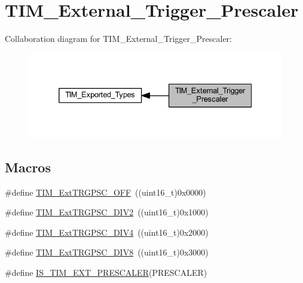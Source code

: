 \hypertarget{group___t_i_m___external___trigger___prescaler}{}\section{T\+I\+M\+\_\+\+External\+\_\+\+Trigger\+\_\+\+Prescaler}
\label{group___t_i_m___external___trigger___prescaler}
Collaboration diagram for T\+I\+M\+\_\+\+External\+\_\+\+Trigger\+\_\+\+Prescaler\+:
\nopagebreak
\begin{figure}[H]
\begin{center}
\leavevmode
\includegraphics[width=332pt]{group___t_i_m___external___trigger___prescaler}
\end{center}
\end{figure}
\subsection*{Macros}
\begin{DoxyCompactItemize}
\item 
\#define \hyperlink{group___t_i_m___external___trigger___prescaler_ga1b21757d5d1b708edca7e20481797e96}{T\+I\+M\+\_\+\+Ext\+T\+R\+G\+P\+S\+C\+\_\+\+O\+FF}~((uint16\+\_\+t)0x0000)
\item 
\#define \hyperlink{group___t_i_m___external___trigger___prescaler_ga446ed7f1bc28bcb295c43886da582e47}{T\+I\+M\+\_\+\+Ext\+T\+R\+G\+P\+S\+C\+\_\+\+D\+I\+V2}~((uint16\+\_\+t)0x1000)
\item 
\#define \hyperlink{group___t_i_m___external___trigger___prescaler_ga1de0031af7654fac2f29705f1da146c6}{T\+I\+M\+\_\+\+Ext\+T\+R\+G\+P\+S\+C\+\_\+\+D\+I\+V4}~((uint16\+\_\+t)0x2000)
\item 
\#define \hyperlink{group___t_i_m___external___trigger___prescaler_gac2fe5014d69a93ce0a22b9f3f5a7d19a}{T\+I\+M\+\_\+\+Ext\+T\+R\+G\+P\+S\+C\+\_\+\+D\+I\+V8}~((uint16\+\_\+t)0x3000)
\item 
\#define \hyperlink{group___t_i_m___external___trigger___prescaler_ga615587e6aae397d9fe8166004e7324f2}{I\+S\+\_\+\+T\+I\+M\+\_\+\+E\+X\+T\+\_\+\+P\+R\+E\+S\+C\+A\+L\+ER}(P\+R\+E\+S\+C\+A\+L\+ER)
\end{DoxyCompactItemize}


